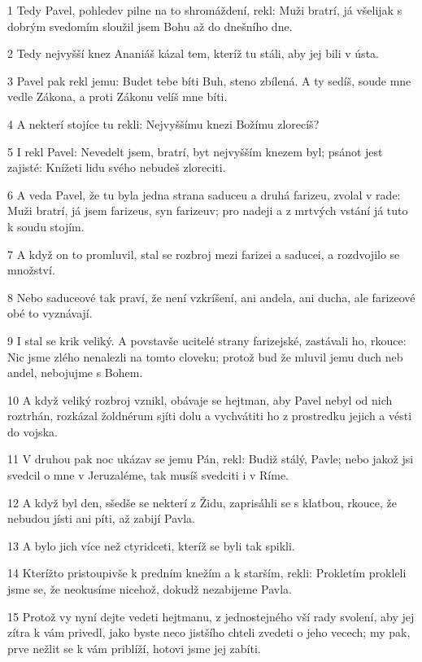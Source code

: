 \par 1 Tedy Pavel, pohledev pilne na to shromáždení, rekl: Muži bratrí, já všelijak s dobrým svedomím sloužil jsem Bohu až do dnešního dne.
\par 2 Tedy nejvyšší knez Ananiáš kázal tem, kteríž tu stáli, aby jej bili v ústa.
\par 3 Pavel pak rekl jemu: Budet tebe bíti Buh, steno zbílená. A ty sedíš, soude mne vedle Zákona, a proti Zákonu velíš mne bíti.
\par 4 A nekterí stojíce tu rekli: Nejvyššímu knezi Božímu zlorecíš?
\par 5 I rekl Pavel: Nevedelt jsem, bratrí, byt nejvyšším knezem byl; psánot jest zajisté: Knížeti lidu svého nebudeš zloreciti.
\par 6 A veda Pavel, že tu byla jedna strana saduceu a druhá farizeu, zvolal v rade: Muži bratrí, já jsem farizeus, syn farizeuv; pro nadeji a z mrtvých vstání já tuto k soudu stojím.
\par 7 A když on to promluvil, stal se rozbroj mezi farizei a saducei, a rozdvojilo se množství.
\par 8 Nebo saduceové tak praví, že není vzkríšení, ani andela, ani ducha, ale farizeové obé to vyznávají.
\par 9 I stal se krik veliký. A povstavše ucitelé strany farizejské, zastávali ho, rkouce: Nic jsme zlého nenalezli na tomto cloveku; protož bud že mluvil jemu duch neb andel, nebojujme s Bohem.
\par 10 A když veliký rozbroj vznikl, obávaje se hejtman, aby Pavel nebyl od nich roztrhán, rozkázal žoldnérum sjíti dolu a vychvátiti ho z prostredku jejich a vésti do vojska.
\par 11 V druhou pak noc ukázav se jemu Pán, rekl: Budiž stálý, Pavle; nebo jakož jsi svedcil o mne v Jeruzaléme, tak musíš svedciti i v Ríme.
\par 12 A když byl den, sšedše se nekterí z Židu, zaprisáhli se s klatbou, rkouce, že nebudou jísti ani píti, až zabijí Pavla.
\par 13 A bylo jich více než ctyridceti, kteríž se byli tak spikli.
\par 14 Kterížto pristoupivše k predním knežím a k starším, rekli: Prokletím prokleli jsme se, že neokusíme nicehož, dokudž nezabijeme Pavla.
\par 15 Protož vy nyní dejte vedeti hejtmanu, z jednostejného vší rady svolení, aby jej zítra k vám privedl, jako byste neco jistšího chteli zvedeti o jeho vecech; my pak, prve nežlit se k vám priblíží, hotovi jsme jej zabíti.
